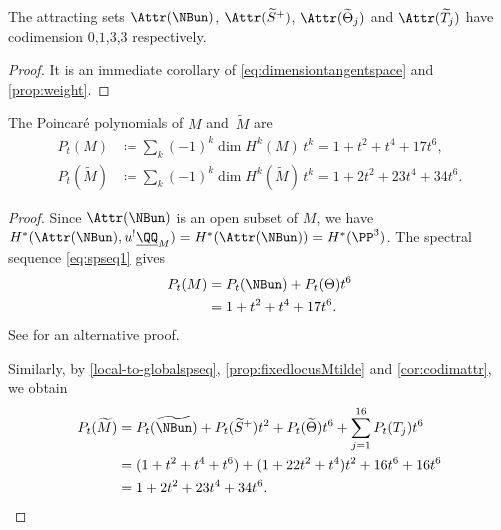 \begin{cor}\label{cor:codimattr}
The attracting sets $\Attr(\NBun)$, $\Attr(\widetilde{S}^+)$, $\Attr(\widetilde{\Theta}_j)$ and $\Attr(\widetilde{T}_j)$ have codimension $0$,$1$,$3$,$3$ respectively.
\end{cor}
\begin{proof}
It is an immediate corollary of \eqref{eq:dimensiontangentspace} and \cref{prop:weight}.
\end{proof}


\begin{thm}\label{thm:PoincarePoly}
The Poincaré polynomials of $M$ and~$\widetilde{M}$ are
\begin{align}\label{eq:Poincarepolynomial}
P_t(M)&\coloneqq \sum_k (-1)^k\dim H^k(M)\,t^k=1+t^2+t^4+17 t^6,
\\
\label{eq:Poincarepolynomialres}
P_t(\widetilde{M})&\coloneqq \sum_k (-1)^k\dim H^k(\widetilde{M})\,t^k = 1+2t^2+23t^4+34t^6.
\end{align}
\end{thm}
\begin{proof}
Since $\Attr(\NBun)$ is an open subset of $M$, we have $H^*(\Attr(\NBun), u^{!}\underline{\QQ}_{M}) = H^*(\Attr(\NBun))=H^*(\PP^3)$. The spectral sequence \eqref{eq:spseq1} gives
\begin{align*}
P_t(M)& =P_t(\NBun) + P_t(\Theta)t^6\\
&= 1+t^2+t^4+17 t^6.
\end{align*}
See \cite[Th.\,1.5]{DaskalopoulosWentworth10} for an alternative proof.

Similarly, by \cref{local-to-globalspseq}, \cref{prop:fixedlocusMtilde} and \cref{cor:codimattr}, we obtain
\begin{align*}
P_t(\widetilde{M})& =P_t(\widetilde{\NBun}) + P_t(\widetilde{S}^+)t^2 + P_t(\widetilde{\Theta})t^6 + \sum^{16}_{j=1}P_t(T_j)t^6\\
& = (1+t^2+t^4+t^6)+(1+22 t^2 +t^4)t^2 + 16t^6 + 16t^6\\
& =1+2t^2+23t^4+34t^6.\qedhere
\end{align*}
\end{proof}

\label{sec:moduliMiota}

